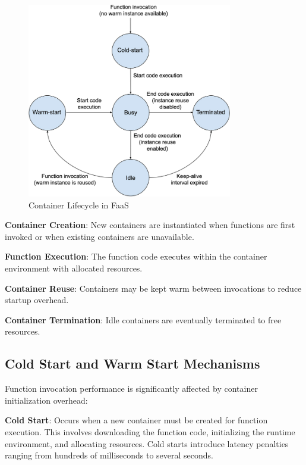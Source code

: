 \begin{figure}[h]
    \centering
    \includegraphics[width=0.8\textwidth]{assets/Life-cycle-state-diagram-of-a-function-instance.png}
    \caption{\small Container Lifecycle in FaaS ~\cite{moreno2023latency}}
    \label{fig:container_lifecycle}
\end{figure}


\textbf{Container Creation}: New containers are instantiated when functions are first invoked or when existing containers are unavailable.

\textbf{Function Execution}: The function code executes within the container environment with allocated resources.

\textbf{Container Reuse}: Containers may be kept warm between invocations to reduce startup overhead.

\textbf{Container Termination}: Idle containers are eventually terminated to free resources.


\subsection{Cold Start and Warm Start Mechanisms}

Function invocation performance is significantly affected by container initialization overhead:

\textbf{Cold Start}: Occurs when a new container must be created for function execution. This involves downloading the function code, initializing the runtime environment, and allocating resources. Cold starts introduce latency penalties ranging from hundreds of milliseconds to several seconds.

